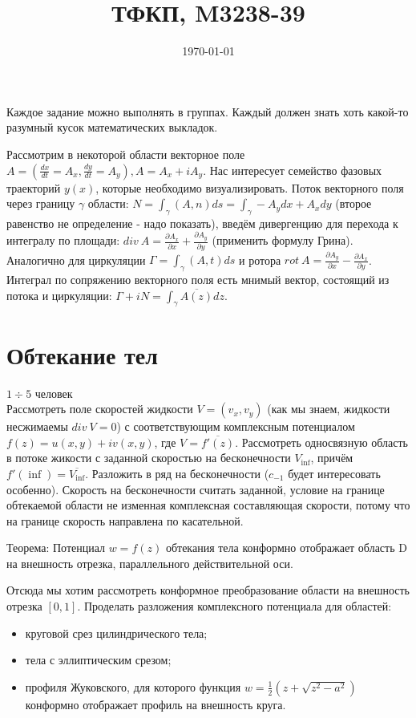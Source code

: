 \documentclass{article}
\title{ТФКП, M3238-39}
\date{\today}
\begin{document}
Каждое задание можно выполнять в группах. Каждый должен знать хоть какой-то разумный кусок математических выкладок.

Рассмотрим в некоторой области векторное поле $A=(\frac{dx}{dt}=A_x, \frac{dy}{dt}=A_y), A=A_x+iA_y$. Нас интересует семейство фазовых траекторий $y(x)$, которые необходимо визуализировать. Поток векторного поля через границу $\gamma$ области: $N = \int_\gamma (A, n)ds = \int_\gamma -A_ydx+A_xdy$ (второе равенство не определение - надо показать), введём дивергенцию для перехода к интегралу по площади: $div~A=\frac{\partial A_x}{\partial x} + \frac{\partial A_y}{\partial y}$ (применить формулу Грина). Аналогично для циркуляции $\Gamma=\int_\gamma (A, t) ds$ и ротора $rot~A=\frac{\partial A_y}{\partial x} - \frac{\partial A_x}{\partial y}$. Интеграл по сопряжению векторного поля есть мнимый вектор, состоящий из потока и циркуляции: $\Gamma+iN=\int_\gamma \overline{A(z)}dz$.

\section*{Обтекание тел}
$1\div5$ человек \\
Рассмотреть поле скоростей жидкости $V=(v_x, v_y)$ (как мы знаем, жидкости несжимаемы $div~V=0$) с соответствующим комплексным потенциалом $f(z)=u(x,y)+iv(x,y)$, где $V=\overline{f'(z)}$. Рассмотреть односвязную область в потоке жикости с заданной скоростью на бесконечности $V_\inf$, причём $f'(\inf) = \overline{V_\inf}$. Разложить в ряд на бесконечности ($c_{-1}$ будет интересовать особенно). Скорость на бесконечности считать заданной, условие на границе обтекаемой области не изменная комплексная составляющая скорости, потому что на границе скорость направлена по касательной. 

Теорема: Потенциал $w = f(z)$ обтекания тела конформно отображает область D на внешность отрезка, параллельного действительной оси.

Отсюда мы хотим рассмотреть конформное преобразование области на внешность отрезка $[0, 1]$. Проделать разложения комплексного потенциала для областей:
\begin{itemize}
\item круговой срез цилиндрического тела;
\item тела с эллиптическим срезом;
\item профиля Жуковского, для которого функция $w=\frac{1}{2}(z+\sqrt{z^2-a^2})$ конформно отображает профиль на внешность круга.
\end{itemize}
\end{document}
